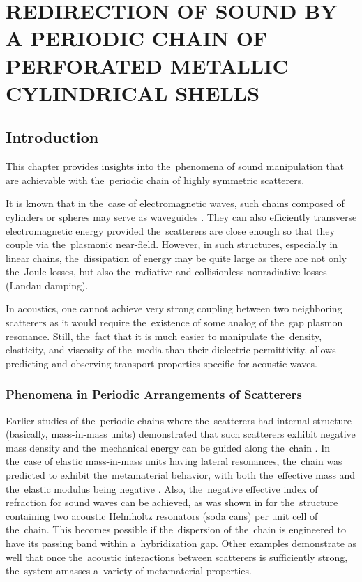 \chapter{REDIRECTION OF SOUND BY A PERIODIC CHAIN OF PERFORATED METALLIC CYLINDRICAL SHELLS}

\section{Introduction}

This chapter provides insights into the~phenomena of sound manipulation that are achievable with the~periodic chain of highly symmetric scatterers.

It is known that in the~case of electromagnetic waves, such chains composed of cylinders or spheres may serve as waveguides \cite{quinten,brongersma,maier}. They can also efficiently transverse electromagnetic energy provided the~scatterers are close enough so that they couple via the~plasmonic near-field.
However, in such structures, especially in linear chains, the~dissipation of energy may be quite large as there are not only the~Joule losses, but also the~radiative \cite{ford,papanikolaou,markel,malyshev,vergeles} and collisionless nonradiative \cite{jalabert} losses (Landau damping).

In acoustics, one cannot achieve very strong coupling between two neighboring scatterers as it would require the~existence of some analog of the~gap plasmon resonance.
Still, the~fact that it is much easier to manipulate the~density, elasticity, and viscosity of the~media than their dielectric permittivity, allows predicting and observing transport properties specific for acoustic waves.

\subsection{Phenomena in Periodic Arrangements of Scatterers}

Earlier studies of the~periodic chains where the~scatterers had internal structure (basically, mass-in-mass units) demonstrated that such scatterers exhibit negative mass density and the~mechanical energy can be guided along the~chain \cite{huang1}.
In the~case of elastic mass-in-mass units having lateral resonances, the~chain was predicted to exhibit the~metamaterial behavior, with both the~effective mass and the~elastic modulus being negative \cite{huang2}.
Also, the~negative effective index of refraction for sound waves can be achieved, as was shown in \cite{kaina} for the~structure containing two acoustic Helmholtz resonators (soda cans) per unit cell of the~chain.
This becomes possible if the~dispersion of the~chain is engineered to have its passing band within a~hybridization gap.
Other examples \cite{haberman,cummer} demonstrate as well that once the~acoustic interactions between scatterers is sufficiently strong, the~system amasses a~variety of metamaterial properties.

